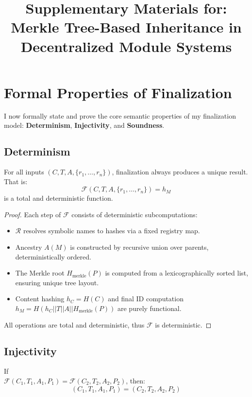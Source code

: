 \documentclass[sigplan,screen]{acmart}
\title{Supplementary Materials for: Merkle Tree-Based Inheritance in Decentralized Module Systems}
\begin{document}
\maketitle

\appendix
\section{Formal Properties of Finalization}
\label{appendix:formal-properties}

I now formally state and prove the core semantic properties of my finalization model: \textbf{Determinism}, \textbf{Injectivity}, and \textbf{Soundness}.

\subsection{Determinism}
\label{appendix:determinism}

\begin{theorem}
\label{thm:determinism}
For all inputs $(C, T, A, \{r_1, \ldots, r_n\})$, finalization always produces a unique result. That is:
\[
\mathcal{F}(C, T, A, \{r_1, \ldots, r_n\}) = h_M
\]
is a total and deterministic function.
\end{theorem}

\begin{proof}
Each step of $\mathcal{F}$ consists of deterministic subcomputations:
\begin{itemize}
    \item $\mathcal{R}$ resolves symbolic names to hashes via a fixed registry map.
    \item Ancestry $A(M)$ is constructed by recursive union over parents, deterministically ordered.
    \item The Merkle root $H_{\text{merkle}}(P)$ is computed from a lexicographically sorted list, ensuring unique tree layout.
    \item Content hashing $h_C = H(C)$ and final ID computation $h_M = H(h_C || T || A || H_{\text{merkle}}(P))$ are purely functional.
\end{itemize}
All operations are total and deterministic, thus $\mathcal{F}$ is deterministic.
\end{proof}
\subsection{Injectivity}
\label{appendix:injectivity}

\begin{theorem}
\label{thm:injectivity}
If \\$\mathcal{F}(C_1, T_1, A_1, P_1) = \mathcal{F}(C_2, T_2, A_2, P_2)$, then:
\[
(C_1, T_1, A_1, P_1) = (C_2, T_2, A_2, P_2)
\]
\end{theorem}
\end{document}

